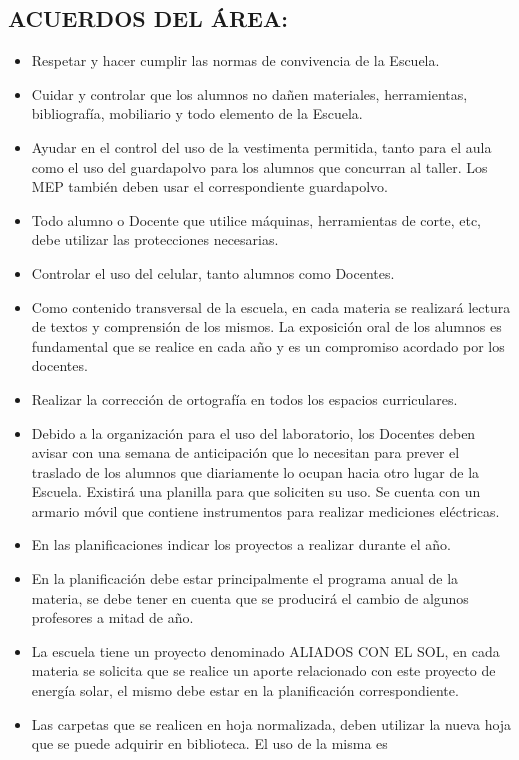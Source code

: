 \documentclass[a4paper,12pt]{article}
\begin{document}
 \subsection*{ACUERDOS DEL ÁREA:}
 \begin{itemize}[itemsep=1pt]
     
\item Respetar y hacer cumplir las normas de convivencia de la Escuela.
\item Cuidar y controlar que los alumnos no dañen materiales, herramientas, bibliografía, mobiliario y todo elemento de la Escuela.
\item Ayudar en el control del uso de la vestimenta permitida, tanto para el aula como el uso del guardapolvo para los alumnos que concurran al
taller. Los MEP también deben usar el correspondiente guardapolvo.
\item Todo alumno o Docente que utilice máquinas, herramientas de corte, etc, debe utilizar las protecciones necesarias.
\item Controlar el uso del celular, tanto alumnos como Docentes.
\item Como contenido transversal de la escuela, en cada materia se realizará lectura de textos y comprensión de los mismos. La exposición oral de
los alumnos es fundamental que se realice en cada año y es un compromiso acordado por los docentes.
\item Realizar la corrección de ortografía en todos los espacios curriculares.
\item Debido a la organización para el uso del laboratorio, los Docentes deben avisar con una semana de anticipación que lo necesitan para
prever el traslado de los alumnos que diariamente lo ocupan hacia otro lugar de la Escuela. Existirá una planilla para que soliciten su uso.
Se cuenta con un armario móvil que contiene instrumentos para realizar mediciones eléctricas.
\item En las planificaciones indicar los proyectos a realizar durante el año.
\item En la planificación debe estar principalmente el programa anual de la materia, se debe tener en cuenta que se producirá el cambio de algunos
profesores a mitad de año.
\item La escuela tiene un proyecto denominado ALIADOS CON EL SOL, en cada materia se solicita que se realice un aporte relacionado con este
proyecto de energía solar, el mismo debe estar en la planificación correspondiente.
\item Las carpetas que se realicen en hoja normalizada, deben utilizar la nueva hoja que se puede adquirir en biblioteca. El uso de la misma es

\end{itemize}
\end{document}
